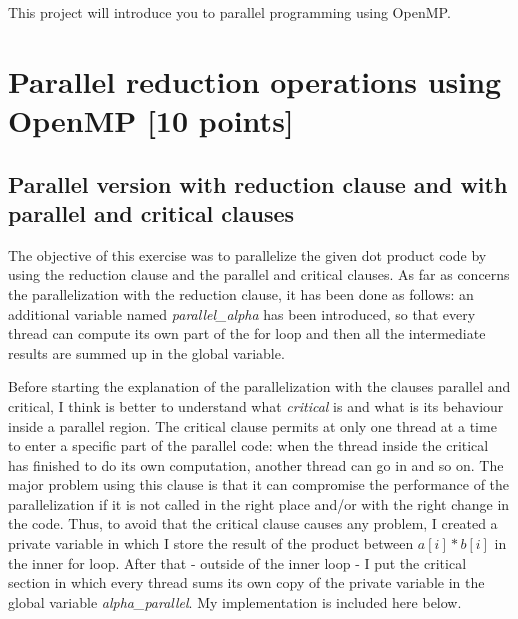 \documentclass[unicode,11pt,a4paper,oneside,numbers=endperiod,openany]{scrartcl}
\begin{document}
\setassignment
{}

\newline

\assignmentpolicy
This project will introduce you to parallel programming using OpenMP.



\section{Parallel reduction operations using OpenMP [10 points]}
\subsection{Parallel version with reduction clause and with parallel and critical clauses}

The objective of this exercise was to parallelize the given dot product code by using the reduction clause and the parallel and critical clauses. As far as concerns the parallelization with the reduction clause, it has been done as follows: an additional variable named \emph{parallel\_alpha} has been introduced, so that every thread can compute its own part of the for loop and then all the intermediate results are summed up in the global variable.

Before starting the explanation of the parallelization with the clauses parallel and critical, I think is better to understand what \textit{critical} is and what is its behaviour inside a parallel region. The critical clause permits at only one thread at a time to enter a specific part of the parallel code: when the thread inside the critical has finished to do its own computation, another thread can go in and so on. The major problem using this clause is that it can compromise the performance of the parallelization if it is not called in the right place and/or with the right change in the code. Thus, to avoid that the critical clause causes any problem, I created a private variable in which I store the result of the product between $a[i] * b[i]$ in the inner for loop. After that - outside of the inner loop - I put the critical section in which every thread sums its own copy of the private variable in the global variable \textit{alpha\_parallel}. My implementation is included here below. \\


\end{document}
